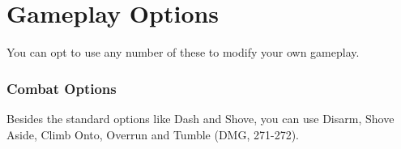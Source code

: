 \documentclass[letterpaper,twocolumn,openany,nodeprecatedcode,bg=print]{dndbook}
\begin{document}







\chapter{Gameplay Options}
\noindent You can opt to use any number of these to modify your own gameplay.

\subsection{Combat Options}
Besides the standard options like Dash and Shove, 
you can use Disarm, Shove Aside, Climb Onto, Overrun and Tumble (DMG, 271-272). 
\end{document}
